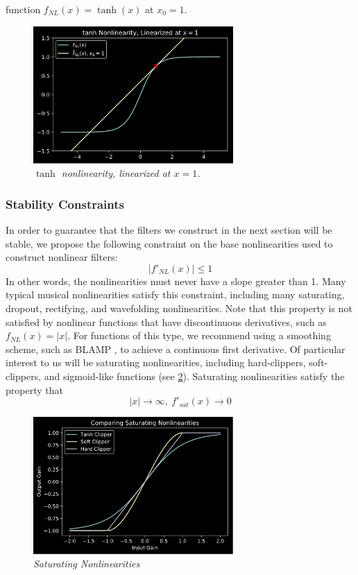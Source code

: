 \documentclass{IEEEtran}
\begin{document}
function $f_{NL}(x) = \tanh(x)$ at $x_0=1$.
%
\begin{figure}[h]
    \center
    \includegraphics[width=3in]{../Pics/tanh_linized.png}
    \caption{\label{tanh_lin}{\it $\tanh$ nonlinearity, linearized at $x=1$.}}
\end{figure}
%
\subsubsection{Stability Constraints}

In order to guarantee that the filters we construct in the next section
will be stable, we propose the following constraint on the base
nonlinearities used to construct nonlinear filters:
%
\begin{equation}
    \left| f'_{NL}(x) \right| \leq 1
    \label{eq:NL_constraint}
\end{equation}
%
In other words, the nonlinearities must never have
a slope greater than 1. Many typical musical nonlinearities satisfy
this constraint, including many saturating, dropout, rectifying,
and wavefolding nonlinearities. Note that this property is not satisfied by
nonlinear functions that have discontinuous derivatives, such as
$f_{NL}(x) = |x|$. For functions of this type, we recommend using a
smoothing scheme, such as BLAMP \cite{BLAMP}, to achieve a continuous
first derivative.
\newline\newline
Of particular interest to us will be saturating
nonlinearities, including hard-clippers, soft-clippers, and sigmoid-like
functions (see \cref{Sats}).
Saturating nonlinearities satisfy the property that
%
\begin{equation}
    |x| \rightarrow \infty, \ f'_{sat}(x) \rightarrow 0
    \label{eq:Sat_constraint}
\end{equation}
%
\begin{figure}[h]
    \center
    \includegraphics[width=3in]{../Pics/Sat-NLs.png}
    \caption{\label{Sats}{\it Saturating Nonlinearities}}
\end{figure}
%
\end{document}
